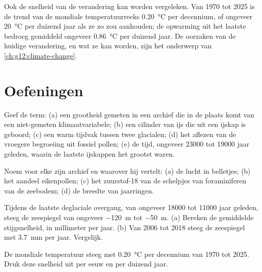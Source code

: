 Ook de snelheid van de verandering kan worden vergeleken. Van 1970 tot 2025 is de trend van
de mondiale temperatuurreeks \qty{0.20}{\degreeCelsius} per decennium, of
ongeveer \qty{20}{\degreeCelsius} per duizend jaar als ze zo zou aanhouden; de
opwarming uit het laatste  bedroeg gemiddeld ongeveer
\qty{0.86}{\degreeCelsius} per duizend jaar. De oorzaken van de huidige verandering,
en wat ze kan worden, zijn het onderwerp van \cref{ch:g12:climate-change}.

\section{Oefeningen}

\begin{exercise}[$\star$]\label{exo:g12:past-climates:1}
Geef de term: (a) een grootheid gemeten in een archief die in de plaats komt van een
niet-gemeten klimaatvariabele; (b) een cilinder van ijs die uit een ijskap is geboord;
(c) een warm tijdvak tussen twee glacialen; (d) het aflezen van de vroegere
begroeiing uit fossiel pollen; (e) de tijd, ongeveer \num{23000} tot \num{19000}
jaar geleden, waarin de laatste ijskappen het grootst waren.
\end{exercise}

\begin{exercise}[$\star$]\label{exo:g12:past-climates:2}
Noem voor elke  zijn archief en waarover hij vertelt: (a) de lucht in
belletjes; (b) het aandeel eikenpollen; (c) het zuurstof-18 van de schelpjes van
foraminiferen van de zeebodem; (d) de breedte van jaarringen.
\end{exercise}

\begin{exercise}[$\star$]\label{exo:g12:past-climates:3}
Tijdens de laatste deglaciale overgang, van ongeveer \num{18000} tot \num{11000}
jaar geleden, steeg de zeespiegel van ongeveer \qty{-120}{m} tot \qty{-50}{m}. (a) Bereken
de gemiddelde stijgsnelheid, in millimeter per jaar. (b) Van 2006 tot 2018 steeg de zeespiegel
met \qty{3.7}{mm} per jaar. Vergelijk.
\end{exercise}

\begin{exercise}[$\star$]\label{exo:g12:past-climates:4}
De mondiale temperatuur steeg met \qty{0.20}{\degreeCelsius} per decennium van
1970 tot 2025. Druk deze snelheid uit per eeuw en per duizend jaar.
\end{exercise}

